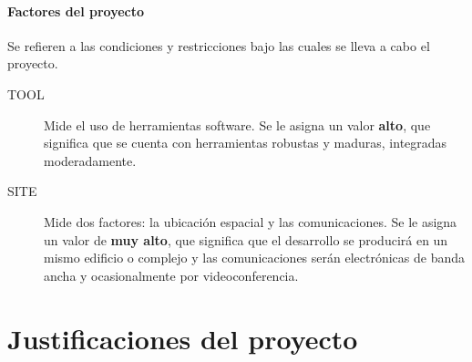 \documentclass[11pt,a4paper,spanish,twoside]{book}
\begin{document}
\subsubsection{Factores del proyecto}
Se refieren a las condiciones y restricciones bajo las cuales se lleva a cabo
el proyecto.
\begin{description}
\item[TOOL] Mide el uso de herramientas software. Se le asigna un valor
\textbf{alto}, que significa que se cuenta con herramientas robustas y
maduras, integradas moderadamente.
\item[SITE] Mide dos factores: la ubicación espacial y las comunicaciones.
Se le asigna un valor de \textbf{muy alto}, que significa que el desarrollo
se producirá en un mismo edificio o complejo y las comunicaciones serán
electrónicas de banda ancha y ocasionalmente por videoconferencia.
\end{description}

\chapter{Justificaciones del proyecto}
\end{document}
